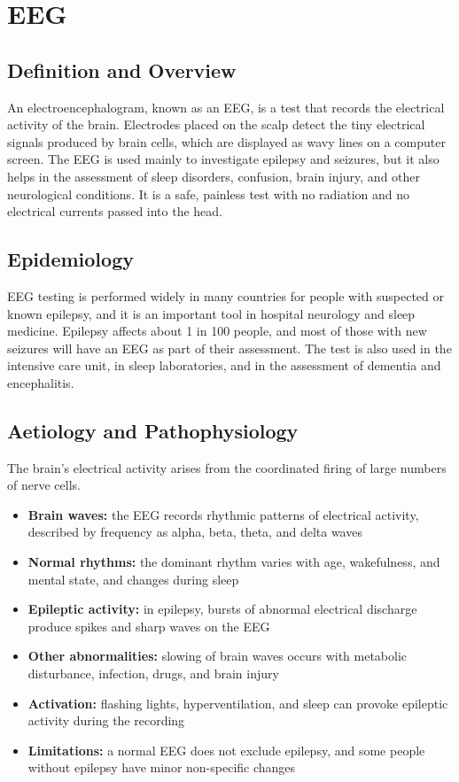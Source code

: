 \chapter{EEG}

\section*{Definition and Overview}
An electroencephalogram, known as an EEG, is a test that records the electrical activity of the brain. Electrodes placed on the scalp detect the tiny electrical signals produced by brain cells, which are displayed as wavy lines on a computer screen. The EEG is used mainly to investigate epilepsy and seizures, but it also helps in the assessment of sleep disorders, confusion, brain injury, and other neurological conditions. It is a safe, painless test with no radiation and no electrical currents passed into the head.

\section*{Epidemiology}
EEG testing is performed widely in many countries for people with suspected or known epilepsy, and it is an important tool in hospital neurology and sleep medicine. Epilepsy affects about 1 in 100 people, and most of those with new seizures will have an EEG as part of their assessment. The test is also used in the intensive care unit, in sleep laboratories, and in the assessment of dementia and encephalitis.

\section*{Aetiology and Pathophysiology}
The brain's electrical activity arises from the coordinated firing of large numbers of nerve cells.
\begin{itemize}
    \item \textbf{Brain waves:} the EEG records rhythmic patterns of electrical activity, described by frequency as alpha, beta, theta, and delta waves
    \item \textbf{Normal rhythms:} the dominant rhythm varies with age, wakefulness, and mental state, and changes during sleep
    \item \textbf{Epileptic activity:} in epilepsy, bursts of abnormal electrical discharge produce spikes and sharp waves on the EEG
    \item \textbf{Other abnormalities:} slowing of brain waves occurs with metabolic disturbance, infection, drugs, and brain injury
    \item \textbf{Activation:} flashing lights, hyperventilation, and sleep can provoke epileptic activity during the recording
    \item \textbf{Limitations:} a normal EEG does not exclude epilepsy, and some people without epilepsy have minor non-specific changes
\end{itemize}

